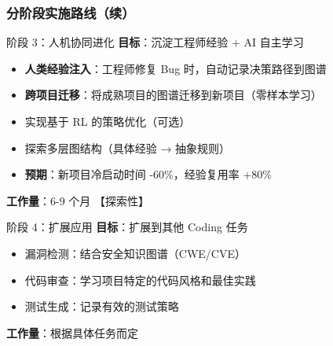 \documentclass[aspectratio=169,10pt]{beamer}
\begin{document}
\begin{frame}
  \frametitle{分阶段实施路线（续）}

  \begin{block}{阶段 3：人机协同进化}
    \footnotesize
    \textbf{目标}：\textcolor{dotred}{沉淀工程师经验 + AI 自主学习}

    \begin{itemize}
      \item \textbf{人类经验注入}：工程师修复 Bug 时，自动记录决策路径到图谱
      \item \textbf{跨项目迁移}：将成熟项目的图谱迁移到新项目（零样本学习）
      \item 实现基于 RL 的策略优化（可选）
      \item 探索多层图结构（具体经验 → 抽象规则）
      \item \textbf{预期}：新项目冷启动时间 -60\%，经验复用率 +80\%
    \end{itemize}

    \textbf{工作量}：6-9 个月 \quad \textcolor{dotyellow}{【探索性】}
  \end{block}

  \vspace{0.3cm}

  \begin{block}{阶段 4：扩展应用}
    \footnotesize
    \textbf{目标}：扩展到其他 Coding 任务

    \begin{itemize}
      \item 漏洞检测：结合安全知识图谱（CWE/CVE）
      \item 代码审查：学习项目特定的代码风格和最佳实践
      \item 测试生成：记录有效的测试策略
    \end{itemize}

    \textbf{工作量}：根据具体任务而定
  \end{block}
\end{frame}
\end{document}
